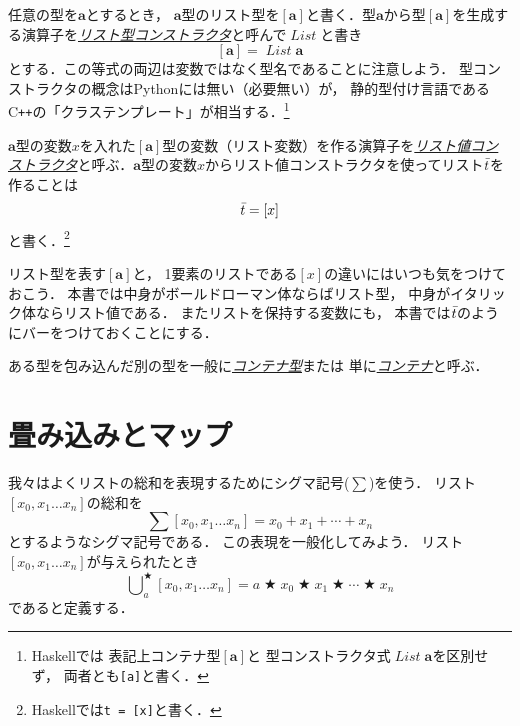 \documentclass[a5paper,draft]{jsbook}
\newcommand{\programminglanguage}[1]{\textsf{#1}}
\newcommand{\cxx}{\programminglanguage{C}\texttt{++}}
\newcommand{\haskell}{\programminglanguage{Haskell}}
\newcommand{\python}{\programminglanguage{Python}}
\newcommand{\keyword}[1]{{\underline{\emph{#1}}}}
\newcommand{\code}[1]{\texttt{#1}}
\newcommand{\mathTypeParameter}[1]{\mathbf{#1}}
\newcommand{\mathTypeConstructor}[1]{\mathit{#1}} %
\newcommand{\mathListVar}[1]{\Bar{#1}}
\newcommand{\mathListType}[1]{\left[#1\right]}
\DeclareMathOperator{\mathList}{\mathTypeConstructor{List}}
\DeclareMathOperator*{\mathFold}{\bigcup}
\newcommand{\mathAnyBinaryOperator}{\mathbin{\bigstar}}
\begin{document}
任意の型を$\mathTypeParameter{a}$とするとき，
$\mathTypeParameter{a}$型のリスト型を$\mathListType{\mathTypeParameter{a}}$と書く．型$\mathTypeParameter{a}$から型$\mathListType{\mathTypeParameter{a}}$を生成する演算子を\keyword{リスト型コンストラクタ}と呼んで$\mathList$と書き
\begin{equation}
\mathListType{\mathTypeParameter{a}}=\mathList\mathTypeParameter{a}
\end{equation}
とする．この等式の両辺は変数ではなく型名であることに注意しよう．
型コンストラクタの概念は\python には無い（必要無い）が，
静的型付け言語である\cxx の「クラステンプレート」が相当する．\footnote{\haskell では
表記上コンテナ型$\mathListType{\mathTypeParameter{a}}$と
型コンストラクタ式$\mathList\mathTypeParameter{a}$を区別せず，
両者とも\code{[a]}と書く．}

$\mathTypeParameter{a}$型の変数$x$を入れた$\mathListType{\mathTypeParameter{a}}$型の変数（リスト変数）を作る演算子を\keyword{リスト値コンストラクタ}と呼ぶ．$\mathTypeParameter{a}$型の変数$x$からリスト値コンストラクタを使ってリスト$\mathListVar{t}$を作ることは
\begin{equation}
\mathListVar{t}=[x]
\end{equation}
と書く．\footnote{\haskell では\code{t = [x]}と書く．}

リスト型を表す$\mathListType{\mathTypeParameter{a}}$と，
1要素のリストである$[x]$の違いにはいつも気をつけておこう．
本書では中身がボールドローマン体ならばリスト型，
中身がイタリック体ならリスト値である．
またリストを保持する変数にも，
本書では$\mathListVar{t}$のようにバーをつけておくことにする．

ある型を包み込んだ別の型を一般に\keyword{コンテナ型}または
単に\keyword{コンテナ}と呼ぶ．

\section{畳み込みとマップ}

我々はよくリストの総和を表現するためにシグマ記号($\sum$)を使う．
リスト$[x_0,x_1\dots x_n]$の総和を
\begin{equation}
\sum[x_0,x_1\dots x_n]=x_0+x_1+\dotsb+x_n
\end{equation}
とするようなシグマ記号である．
この表現を一般化してみよう．
リスト$[x_0,x_1\dots x_n]$が与えられたとき
\begin{equation}
\mathFold^{\mathAnyBinaryOperator}_{a}[x_0,x_1\dots x_n]=a\mathAnyBinaryOperator x_0\mathAnyBinaryOperator x_1\mathAnyBinaryOperator\dotsb\mathAnyBinaryOperator x_n
\end{equation}
であると定義する．
\end{document}
